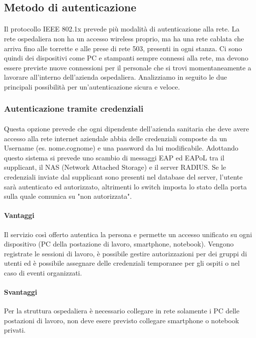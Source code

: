 \subsection{Metodo di autenticazione}
\paragraph{} Il protocollo IEEE 802.1x prevede più modalità di autenticazione alla rete. La rete ospedaliera non ha un accesso wireless proprio, ma ha una rete cablata che arriva fino alle torrette e alle prese di rete 503, presenti in ogni stanza. Ci sono quindi dei dispositivi come PC e stampanti sempre connessi alla rete, ma devono essere previste nuove connessioni per il personale che si trovi momentaneamente a lavorare all'interno dell'azienda ospedaliera. Analizziamo in seguito le due principali possibilità per un'autenticazione sicura e veloce.

\subsubsection{Autenticazione tramite credenziali}
\paragraph{} Questa opzione prevede che ogni dipendente dell'azienda sanitaria che deve avere accesso alla rete internet aziendale abbia delle credenziali composte da un Username (es. nome.cognome) e una password da lui modificabile. Adottando questo sistema si prevede uno scambio di messaggi EAP ed EAPoL tra il supplicant, il NAS (Network Attached Storage) e il server RADIUS. Se le credenziali inviate dal supplicant sono presenti nel database del server, l'utente sarà autenticato ed autorizzato, altrimenti lo switch imposta lo stato della porta sulla quale comunica su "non autorizzata".
\paragraph{Vantaggi} Il servizio così offerto autentica la persona e permette un accesso unificato su ogni dispositivo (PC della postazione di lavoro, smartphone, notebook). Vengono registrate le sessioni di lavoro, è possibile gestire autorizzazioni per dei gruppi di utenti ed è possibile assegnare delle credenziali temporanee per gli ospiti o nel caso di eventi organizzati. 
\paragraph{Svantaggi} Per la struttura ospedaliera è necessario collegare in rete solamente i PC delle postazioni di lavoro, non deve esere previsto collegare smartphone o notebook privati.

